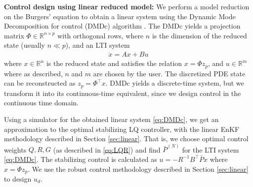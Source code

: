 \documentclass[10pt,a4paper]{amsart}
\newcommand{\tp}{^\top}
\newcommand{\inv}{^{-1}}
\newcommand{\R}{\mathbb{R}}
\begin{document}
\noindent \textbf{Control design using linear reduced model:} 
We perform a model reduction on the Burgers' equation to obtain a linear system using the Dynamic Mode Decomposition for control (DMDc) algorithm \cite{zhang-2024}. The DMDc yields a projection matrix $\Phi \in \R^{n \times p}$ with orthogonal rows, where $n$ is the dimension of the reduced state (usually $n \ll p$), and an LTI system  
\begin{align}
\dot{x} = Ax + Bu
\label{eq:DMDc}
\end{align}
where $x \in \R^n$ is the reduced state and satisfies the relation $x = \Phi z_p$, and $u \in \R^m$ where as described, $n$ and $m$ are chosen by the user. The discretized PDE state can be reconstructed as $z_p = \Phi\tp x$. DMDc yields a discrete-time system, but we transform it into its continuous-time equivalent, since we design control in the continuous time domain. 

Using a simulator for the obtained linear system \eqref{eq:DMDc}, we get an approximation to the optimal stabilizing LQ controller, with the linear EnKF methodology described in Section \ref{sec:linear}. 
That is, we choose optimal control weights $Q,R,G$ (as described in \eqref{eq:LQR}) and find $\bar{P}^{(N)}$ for the LTI system \eqref{eq:DMDc}. The stabilizing control is calculated as $u = -R\inv B\tp \bar{P} x$ where $x = \Phi z_p$. We use the robust control methodology described in Section \ref{sec:linear} to design $u_d$. 



\end{document}

